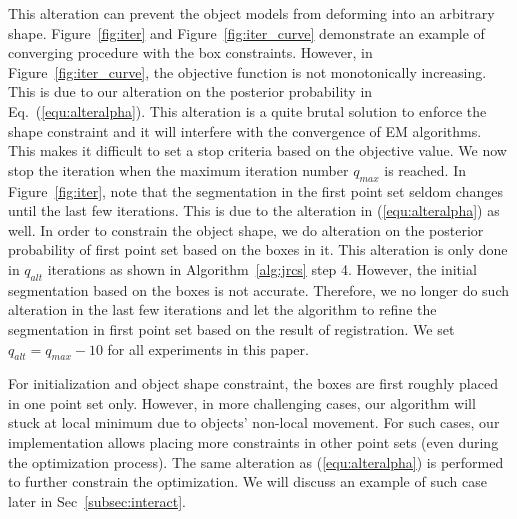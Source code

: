 This alteration can prevent the object models from deforming into an arbitrary shape.
%
%
Figure~\ref{fig:iter} and Figure~\ref{fig:iter_curve} demonstrate an example of converging procedure with the box constraints. 
%
%
However, in Figure~\ref{fig:iter_curve}, the objective function is not monotonically increasing. 
This is due to our alteration on the posterior probability in Eq.~(\ref{equ:alteralpha}). This alteration is a quite brutal solution to enforce the shape constraint and it will interfere with the convergence of EM algorithms.
% 
This makes it difficult to set a stop criteria based on the objective value. 
We now stop the iteration when the maximum iteration number $q_{max}$ is reached.
In Figure~\ref{fig:iter}, note that the segmentation in the first point set seldom changes until the last few iterations. 
%
This is due to the alteration in (\ref{equ:alteralpha}) as well. 
%
In order to constrain the object shape, we do alteration on the posterior probability of first point set based on the boxes in it. This alteration is only done in $q_{alt}$ iterations as shown in Algorithm~\ref{alg:jrcs} step 4. 
However, the initial segmentation based on the boxes is not accurate. 
Therefore, we no longer do such alteration in the last few iterations and let the algorithm to refine the segmentation in first point set based on the result of registration. 
We set $q_{alt}=q_{max}-10$ for all experiments in this paper.

For initialization and object shape constraint, the boxes are first roughly placed in one point set only. 
However, in more challenging cases, our algorithm will stuck at local minimum due to objects' non-local movement. 
For such cases, our implementation allows placing more constraints in other point sets (even during the optimization process). 
The same alteration as (\ref{equ:alteralpha}) is performed to further constrain the optimization. We will discuss an example of such case later in Sec~\ref{subsec:interact}.

